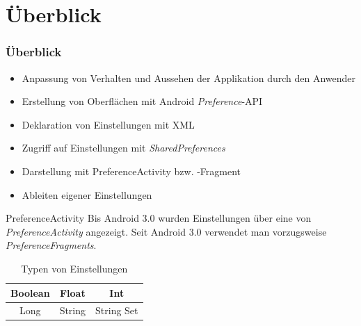 \section{Überblick}
\begin{frame}
   \frametitle{Überblick}
   \begin{itemize}
      \item Anpassung von Verhalten und Aussehen der Applikation durch den 
         Anwender
      \item Erstellung von Oberflächen mit Android \emph{Preference}-API 
      \item Deklaration von Einstellungen mit XML
      \item Zugriff auf Einstellungen mit \emph{SharedPreferences}
      \item Darstellung mit PreferenceActivity bzw. -Fragment
      \item Ableiten eigener Einstellungen
   \end{itemize}

   \begin{alertblock}{PreferenceActivity}
      Bis Android 3.0 wurden Einstellungen über eine von \emph{PreferenceActivity} angezeigt. 
      Seit Android 3.0 verwendet man vorzugsweise \emph{PreferenceFragments}.
   \end{alertblock}

   \begin{table}[t]
      \begin{center}
         \begin{tabular}{c|c|c}
            Boolean & Float & Int\\
            \hline
            Long & String & String Set\\
         \end{tabular}
         \label{tab:preference_types}
         \caption{Typen von Einstellungen}
      \end{center}
   \end{table}
\end{frame}

